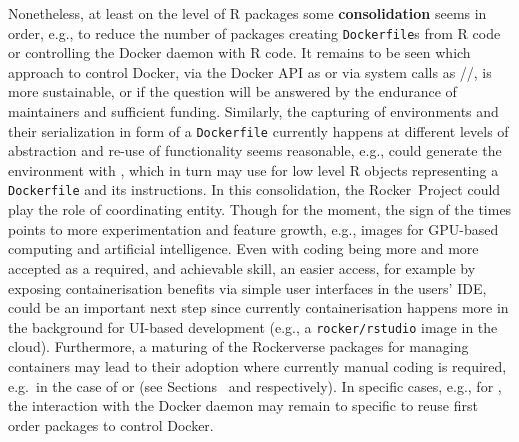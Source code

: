 Nonetheless, at least on the level of R packages some
\textbf{consolidation} seems in order, e.g., to reduce the number of
packages creating \texttt{Dockerfile}s from R code or controlling the
Docker daemon with R code. It remains to be seen which approach to
control Docker, via the Docker API as  or via system
calls as //, is more sustainable,
or if the question will be answered by the endurance of maintainers and
sufficient funding. Similarly, the capturing of environments and their
serialization in form of a \texttt{Dockerfile} currently happens at
different levels of abstraction and re-use of functionality seems
reasonable, e.g.,  could generate the environment with
, which in turn may use  for low level
R objects representing a \texttt{Dockerfile} and its instructions. In
this consolidation, the Rocker~Project could play the role of
coordinating entity. Though for the moment, the sign of the times points
to more experimentation and feature growth, e.g., images for GPU-based
computing and artificial intelligence. Even with coding being more and
more accepted as a required, and achievable skill, an easier access, for
example by exposing containerisation benefits via simple user interfaces
in the users' IDE, could be an important next step since currently
containerisation happens more in the background for UI-based development
(e.g., a \texttt{rocker/rstudio} image in the cloud). Furthermore, a
maturing of the Rockerverse packages for managing containers may lead to
their adoption where currently manual coding is required, e.g.~in the
case of  or  (see
Sections~ and  respectively). In
specific cases, e.g., for , the interaction with the
Docker daemon may remain to specific to reuse first order packages to
control Docker.

